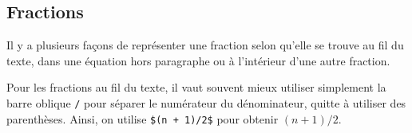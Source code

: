 
\subsection{Fractions}
\label{sec:math:bases:fractions}

Il y a plusieurs façons de représenter une fraction selon qu'elle se
trouve au fil du texte, dans une équation hors paragraphe ou à
l'intérieur d'une autre fraction.

Pour les fractions au fil du texte, il vaut souvent mieux utiliser
simplement la barre oblique \verb=/= pour séparer le numérateur du
dénominateur, quitte à utiliser des parenthèses. Ainsi, on utilise
\verb=$(n + 1)/2$= pour obtenir $(n + 1)/2$.

